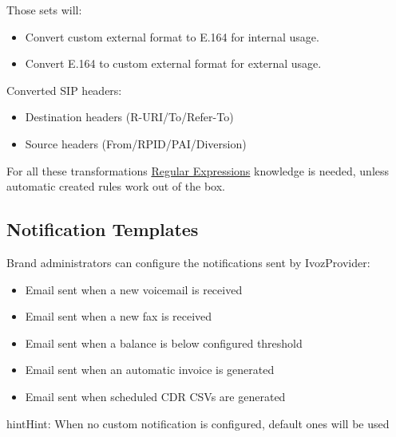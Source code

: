 \documentclass[letterpaper,10pt,english]{sphinxmanual}
\begin{document}
Those sets will:
\begin{itemize}
\item {} 
Convert custom external format to E.164 for internal usage.

\item {} 
Convert E.164 to custom external format for external usage.

\end{itemize}

Converted SIP headers:
\begin{itemize}
\item {} 
Destination headers (R-URI/To/Refer-To)

\item {} 
Source headers (From/RPID/PAI/Diversion)

\end{itemize}

For all these transformations \href{http://php.net/manual/en/reference.pcre.pattern.syntax.php}{Regular Expressions} knowledge
is needed, unless automatic created rules work out of the box.


\subsection{Notification Templates}
\label{administration_portal/brand/settings/notification_templates::doc}\label{administration_portal/brand/settings/notification_templates:notification-templates}\label{administration_portal/brand/settings/notification_templates:id1}
Brand administrators can configure the notifications sent by IvozProvider:
\begin{itemize}
\item {} 
Email sent when a new voicemail is received

\item {} 
Email sent when a new fax is received

\item {} 
Email sent when a balance is below configured threshold

\item {} 
Email sent when an automatic invoice is generated

\item {} 
Email sent when scheduled CDR CSVs are generated

\end{itemize}

\begin{notice}{hint}{Hint:}
When no custom notification is configured, default ones will be used
\end{notice}
\end{document}
